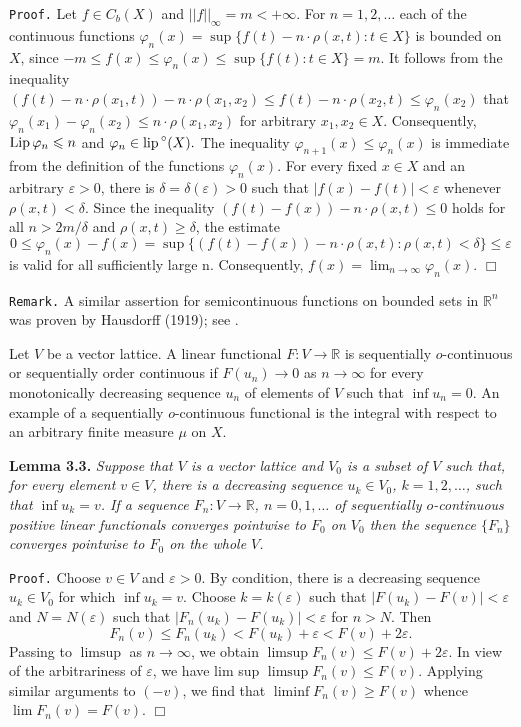 \documentclass[11pt,a4paper]{article}
\begin{document}
{\tt Proof.} %
Let $f\in C_b(X)$ and $||f||_{\infty}=m<+\infty$.
For $n=1,2,\ldots$ each of the continuous functions
$\varphi_n(x)=\sup\{f(t)-n\cdot\rho(x,t): t\in X\}$
is bounded on $X$, since
$-m\le f(x)\le\varphi_n(x)\le\sup\{f(t): t\in X\}=m.$
It follows from the inequality
$(f(t)-n\cdot\rho(x_1,t))-n\cdot\rho(x_1,x_2) \le f(t)-n\cdot\rho(x_2,t) \le \varphi_n(x_2)$
that
$\varphi_n(x_1)-\varphi_n(x_2)\le n\cdot\rho(x_1,x_2)$
for arbitrary $x_1,x_2\in X$.
Consequently, ${\rm Lip\,}\varphi_n\leqslant n$ and $\varphi_n\in{\rm lip\,}^{\circ}(X).$
The inequality ${\varphi_{n+1}(x)\le\varphi_n(x)}$
is immediate from the definition of the functions $\varphi_n(x)$.
For every fixed $x\in X$ and an arbitrary $\varepsilon>0$, there is
$\delta=\delta(\varepsilon)>0$ such that $|f(x)-f(t)|<\varepsilon$
whenever $\rho(x,t)<\delta$.
Since the inequality
$(f(t)-f(x))-n\cdot\rho(x,t)\le 0$
holds for all $n>2m/\delta$ and $\rho(x,t)\ge\delta$, the estimate
$$0\le\varphi_n(x)-f(x)=\sup\{(f(t)-f(x))-n\cdot\rho(x,t): \rho(x,t)<\delta\}\le\varepsilon$$
is valid for all sufficiently large n. Consequently,
$f(x)=\lim_{n\to\infty}\varphi_n(x)$. \hbox{$\Box$}
\vspace{1em}

{\tt Remark.}
A similar assertion for semicontinuous functions
on bounded sets in $\mathbb{R}^n$ was proven by
Hausdorff (1919); see \cite[Theorem II.5]{Ts}.
\vspace{1em}

Let $V$ be a vector lattice. A linear functional
$F:V\to\mathbb{R}$ is {sequentially $o$-continuous}
or {sequentially order continuous}
if $F(u_n)\to 0$ as $n\to\infty$ for every monotonically decreasing sequence $u_n$ of elements
of $V$ such that $\inf u_n=0$.
An example of a sequentially $o$-continuous functional is the integral
with respect to an arbitrary finite measure $\mu$ on $X$.

\vspace{1em} {\bf Lemma 3.3.} \sl
Suppose that $V$ is a vector lattice and $V_0$ is a subset of $V$ such that,
for every element $v\in V$,
there is a decreasing sequence $u_k\in V_0$, $k=1,2,\ldots$, such that $\inf u_k=v$.
If a sequence
$F_n:V\to\mathbb{R}$, $n=0,1,\ldots$
of sequentially $o$-continuous positive linear functionals
converges pointwise to $F_0$ on $V_0$
then the sequence $\{F_n\}$ converges pointwise to $F_0$
on the whole $V$. \rm

\vspace{1em} {\tt Proof.}
Choose $v\in V$ and $\varepsilon>0$.
By condition, there is a decreasing sequence $u_k\in V_0$
for which $\inf u_k=v$.
Choose $k=k(\varepsilon)$ such that ${|F(u_k)-F(v)|<\varepsilon}$
and $N=N(\varepsilon)$ such that ${|F_n(u_k)-F(u_k)|<\varepsilon}$
for ${n>N}$. Then
$$F_n(v)\le F_n(u_k)< F(u_k)+\varepsilon< F(v)+2\varepsilon.$$
Passing to $\limsup$ as $n\to\infty$, we obtain
$\limsup F_n(v)\le F(v)+2\varepsilon$.
In view of the arbitrariness of $\varepsilon$, we have lim sup $\limsup F_n(v)\le F(v)$.
Applying similar arguments to $(-v)$, we find that
${\liminf F_n(v)\ge F(v)}$ whence ${\lim F_n(v)=F(v)}$.
\hbox{$\Box$}
\end{document}
